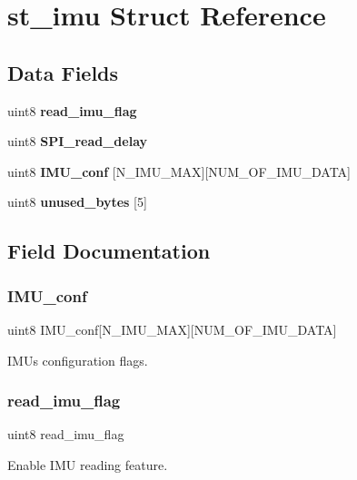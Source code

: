 \section{st\+\_\+imu Struct Reference}
\label{structst__imu}
\subsection*{Data Fields}
\begin{DoxyCompactItemize}
\item 
uint8 \textbf{ read\+\_\+imu\+\_\+flag}
\item 
uint8 \textbf{ S\+P\+I\+\_\+read\+\_\+delay}
\item 
uint8 \textbf{ I\+M\+U\+\_\+conf} [N\+\_\+\+I\+M\+U\+\_\+\+M\+AX][N\+U\+M\+\_\+\+O\+F\+\_\+\+I\+M\+U\+\_\+\+D\+A\+TA]
\item 
uint8 \textbf{ unused\+\_\+bytes} [5]
\end{DoxyCompactItemize}


\subsection{Field Documentation}
\mbox{\label{structst__imu_ada640cf3ec631c3b1cba76c486ea6b04}} 
\subsubsection{I\+M\+U\+\_\+conf}
{\footnotesize\ttfamily uint8 I\+M\+U\+\_\+conf[N\+\_\+\+I\+M\+U\+\_\+\+M\+AX][N\+U\+M\+\_\+\+O\+F\+\_\+\+I\+M\+U\+\_\+\+D\+A\+TA]}

I\+M\+Us configuration flags. \mbox{\label{structst__imu_a02e930c22d986c574b7041926068e65d}} 
\subsubsection{read\+\_\+imu\+\_\+flag}
{\footnotesize\ttfamily uint8 read\+\_\+imu\+\_\+flag}

Enable I\+MU reading feature. \mbox{\label{structst__imu_aa5b15dee0878926cf86de9d3a70d3b30}} 
